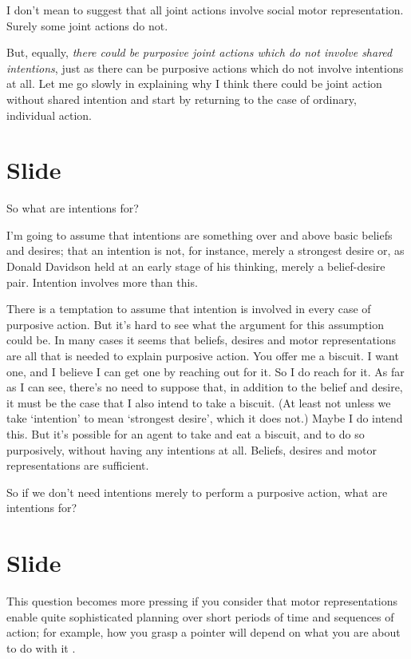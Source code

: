 \documentclass[12pt,\papersize]{extarticle}
\begin{document}
I don’t mean to suggest that all joint actions involve social motor representation.  Surely some joint actions do not. 

But, equally, \emph{there could be purposive joint actions which do not involve shared intentions},
just as there can be purposive actions which do not involve intentions at all.
Let me go slowly in explaining why I think there could be joint action without shared intention and start by returning to the case of ordinary, individual action.




\section{Slide}
So what are intentions for?

I’m going to assume that intentions are something over and above basic beliefs and desires; that an intention is not, for instance, merely a strongest desire or, as Donald Davidson held at an early stage of his thinking, merely a belief-desire pair.
Intention involves more than this.

There is a temptation to assume that intention is involved in every case of purposive action.
But it’s hard to see what the argument for this assumption could be.
In many cases it seems that beliefs, desires and motor representations are all that is needed to explain purposive action. 
You offer me a biscuit.  I want one, and I believe I can get one by reaching out for it.  So I do reach for it.  As far as I can see, there’s no need to suppose that, in addition to the belief and desire, it must be the case that I also intend to take a biscuit.  
(At least not unless we take ‘intention’ to mean ‘strongest desire’, which it does not.)  
Maybe I do intend this.  
But it’s possible for an agent to take and eat a biscuit, and to do so purposively, without having any intentions at all.  
Beliefs, desires and motor representations are sufficient.

So if we don't need intentions merely to perform a purposive action, what are intentions for?



\section{Slide}
This question becomes more pressing if you consider that motor representations enable quite sophisticated planning over short periods of time and sequences of action; for example, how you grasp a pointer will depend on what you are about to do with it \citep{zhang:2007_planning}.
\end{document}
